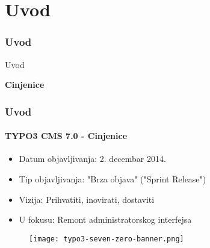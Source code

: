 %

\section{Uvod}
\begin{frame}[fragile]
	\frametitle{Uvod}

	\begin{center}\huge{Uvod}\end{center}
	\begin{center}\huge{\color{typo3darkgrey}\textbf{Cinjenice}}\end{center}

\end{frame}


\begin{frame}[fragile]
	\frametitle{Uvod}
	\framesubtitle{TYPO3 CMS 7.0 - Cinjenice}

	\begin{itemize}
		\item Datum objavljivanja: 2. decembar 2014.
		\item Tip objavljivanja: "Brza objava" ("Sprint Release")
		\item Vizija: Prihvatiti, inovirati, dostaviti
		\item U fokusu: Remont administratorskog interfejsa
	\end{itemize}

	\begin{figure}
		\texttt{[image: typo3-seven-zero-banner.png]}
	\end{figure}

\end{frame}

